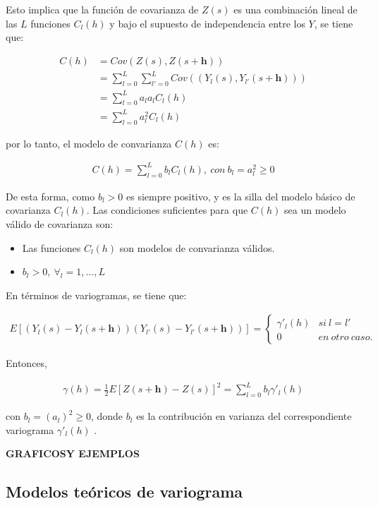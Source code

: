 \documentclass[
]{book}
\providecommand{\tightlist}{%
  \setlength{\itemsep}{0pt}\setlength{\parskip}{0pt}}
\begin{document}
Esto implica que la función de covarianza de \(Z(s)\) es una combinación lineal de las \(L\) funciones \(C_l(h)\) y bajo el supuesto de independencia entre los \(Y\), se tiene que:

\begin{align}
    C(h)&=Cov(Z(s),Z(s+\textbf{h}))\\
    &= \sum_{l=0}^L\sum_{l'=0}^L Cov((Y_l(s),Y_{l'}(s+\textbf{h}))) \\
    &=\sum_{l=0}^La_la_lC_l(h)\\
    &=\sum_{l=0}^La_l^2C_l(h)
\end{align}

por lo tanto, el modelo de convarianza \(C(h)\) es:

\begin{align}
  C(h)=\sum_{l=0}^Lb_lC_l(h),\ con\ b_l=a_l^2\geq 0  
\end{align}

De esta forma, como \(b_l>0\) es siempre positivo, y es la silla del modelo básico de covarianza \(C_l(h)\). Las condiciones suficientes para que \(C(h)\) sea un modelo válido de covarianza son:

\begin{itemize}
\tightlist
\item
  Las funciones \(C_l(h)\) son modelos de convarianza válidos.
\item
  \(b_l>0,\ \forall_l=1,...,L\)
\end{itemize}

En términos de variogramas, se tiene que:

\begin{align}
  E\left[ (Y_l(s)-Y_l(s+\textbf{h}))(Y_{l'}(s)-Y_{l'}(s+\textbf{h}))  \right]=\left \{ \begin{matrix} \gamma'_l(h) & si\ l=l'\\ 
0 & en\ otro\ caso. 
\end{matrix}\right.    
\end{align}

Entonces,

\begin{align}
   \gamma(h)=\frac{1}{2} E[Z(s+\textbf{h})-Z(s)]^2=\sum_{l=0}^Lb_l\gamma'_l(h) 
\end{align}

con \(b_l=(a_l)^2\geq 0\), donde \(b_l\) es la contribución en varianza del correspondiente variograma \(\gamma'_l(h)\) \citep{marta}.

\textbf{GRAFICOSY EJEMPLOS}

\hypertarget{modelos-teuxf3ricos-de-variograma}{%
\subsection{Modelos teóricos de variograma}\label{modelos-teuxf3ricos-de-variograma}}
\end{document}
